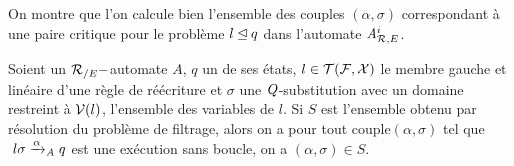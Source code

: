 On montre que l'on calcule bien l'ensemble des couples $(\alpha,\sigma)$
correspondant à une paire critique pour le problème $l \unlhd q$ dans l'automate ${\mathit A}_{\mathcal R,E}^i$.

\begin{property}
  \label{prop:matching-complete}
  Soient un ${\mathcal R_{/E}}-$automate $A$, $q$ un de ses états, $l \in \mathcal{T(F, X)}$ le
  membre gauche et linéaire d'une règle de réécriture et $\sigma$ une
  $\mathit Q$-substitution avec un domaine restreint à $\mathcal V(l)$, l'ensemble des variables de $l$.  Si $S$
  est l'ensemble obtenu par résolution du problème de filtrage, alors on a pour
  tout couple$(\alpha, \sigma)$ tel que $\ l\sigma \xrightarrow{\alpha}_\mathit A q$ est une
  exécution sans boucle, on a $(\alpha, \sigma) \in S$.
\end{property}

